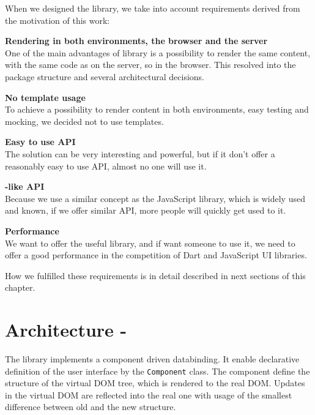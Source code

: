   When we designed the \tiles library, we take into account requirements derived from the motivation of this work:

  \begin{description}
    \item{\textbf{Rendering in both environments, the browser and the server}} \hfill \\
      One of the main advantages of \tiles library is a possibility to render the same content, 
      with the same code as on the server, so in the browser.
      This resolved into the package structure and several architectural decisions.
      \begin{description}
        \item{\textbf{No template usage}} \hfill \\
          To achieve a possibility to render content in both environments, easy testing and mocking, 
          we decided not to use templates.
      \end{description}
    \item{\textbf{Easy to use API}} \hfill \\
      The solution can be very interesting and powerful, 
      but if it don't offer a reasonably easy to use API, almost no one will use it.
      \begin{description}
        \item{\textbf{\react-like API}} \hfill \\
          Because we use a similar concept as the JavaScript \react library,  
          which is widely used and known, 
          if we offer similar API, more people will quickly get used to it.
      \end{description}
    \item{\textbf{Performance}} \hfill \\
      We want to offer the useful library, and if want someone to use it, 
      we need to offer a good performance in the competition of Dart and JavaScript UI libraries.
  \end{description}

  How we fulfilled these requirements is in detail described in next sections of this chapter.

\section{Architecture - \tiles}\label{sec:our-architecture}

  The \tiles library implements a component driven databinding. 
  It enable declarative definition of the user interface by the \texttt{Component} class.
  The component define the structure of the virtual DOM tree, which is rendered to the real DOM. 
  Updates in the virtual DOM are reflected into the real one with usage of the smallest difference between old and the new structure.
  

